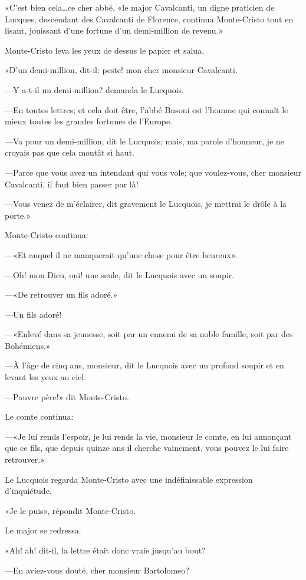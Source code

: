 «C'est bien cela\dots ce cher abbé, «le major Cavalcanti, un digne praticien de Lucques, descendant des Cavalcanti de Florence, continua Monte-Cristo tout en lisant, jouissant d'une fortune d'un demi-million de revenu.»  

Monte-Cristo leva les yeux de dessus le papier et salua. 

«D'un demi-million, dit-il; peste! mon cher monsieur Cavalcanti. 

—Y a-t-il un demi-million? demanda le Lucquois. 

—En toutes lettres; et cela doit être, l'abbé Busoni est l'homme qui connaît le mieux toutes les grandes fortunes de l'Europe. 

—Va pour un demi-million, dit le Lucquois; mais, ma parole d'honneur, je ne croyais pas que cela montât si haut. 

—Parce que vous avez un intendant qui vous vole; que voulez-vous, cher monsieur Cavalcanti, il faut bien passer par là! 

—Vous venez de m'éclairer, dit gravement le Lucquois, je mettrai le drôle à la porte.» 

Monte-Cristo continua: 

—«Et auquel il ne manquerait qu'une chose pour être heureux». 

—Oh! mon Dieu, oui! une seule, dit le Lucquois avec un soupir. 

—«De retrouver un fils adoré.» 

—Un fils adoré! 

—«Enlevé dans sa jeunesse, soit par un ennemi de sa noble famille, soit par des Bohémiens.» 

—À l'âge de cinq ans, monsieur, dit le Lucquois avec un profond soupir et en levant les yeux au ciel. 

—Pauvre père!» dit Monte-Cristo. 

Le comte continua: 

—«Je lui rends l'espoir, je lui rends la vie, monsieur le comte, en lui annonçant que ce fils, que depuis quinze ans il cherche vainement, vous pouvez le lui faire retrouver.» 

Le Lucquois regarda Monte-Cristo avec une indéfinissable expression d'inquiétude. 

«Je le puis», répondit Monte-Cristo. 

Le major se redressa. 

«Ah! ah! dit-il, la lettre était donc vraie jusqu'au bout?  

—En aviez-vous douté, cher monsieur Bartolomeo? 

